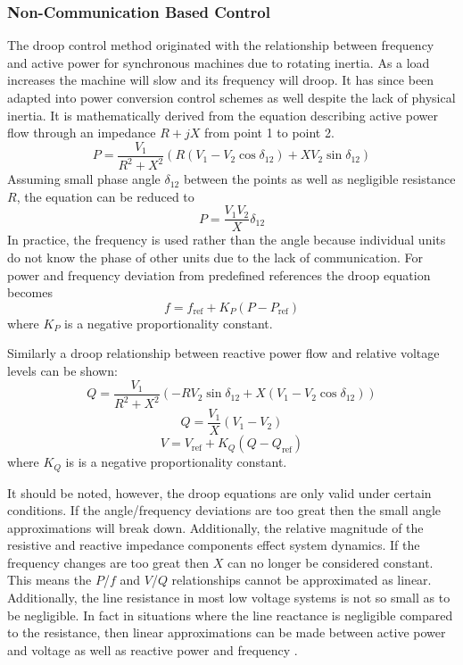 \subsubsection{Non-Communication Based Control}
The droop control method originated with the relationship between frequency and active power for synchronous machines due to rotating inertia. As a load increases the machine will slow and its frequency will droop. It has since been adapted into power conversion control schemes as well despite the lack of physical inertia. It is mathematically derived from the equation describing active power flow through an impedance $ R + jX $ from point 1 to point 2.
\begin{equation}
P = \frac{V_{1}}{R^2 + X^2} \left( R \left( V_{1}-V_{2}\cos{\delta_{12}} \right) +X V_{2} \sin{\delta_{12}} \right)
\end{equation}
Assuming small phase angle $\delta_{12}$ between the points as well as negligible resistance $R$, the equation can be reduced to 
\begin{equation}
P = \frac{V_1V_2}{X}\delta_{12}
\end{equation}
In practice, the frequency is used rather than the angle because individual units do not know the phase of other units due to the lack of communication. For power and frequency deviation from predefined references the droop equation becomes
\begin{equation}
f = f_{\text{ref}} + K_P\left(P - P_{\text{ref}}\right)
\end{equation}
where $K_P$ is a negative proportionality constant.

Similarly a droop relationship between reactive power flow and relative voltage levels can be shown:
\begin{equation}
Q = \frac{V_1}{R^2 + X^2} \left( -R V_2 \sin{\delta_{12}} + X \left(V_1 - V_2 \cos{\delta_{12}}\right) \right)
\end{equation}
\begin{equation}
Q = \frac{V_1}{X} \left( V_1 - V_2 \right)
\end{equation}
\begin{equation}
V = V_{\text{ref}} + K_Q \left( Q - Q_{\text{ref}} \right)
\end{equation}
where $K_Q$ is is a negative proportionality constant. 

It should be noted, however, the droop equations are only valid under certain conditions. If the angle/frequency deviations are too great then the small angle approximations will break down. Additionally, the relative magnitude of the resistive and reactive impedance components effect system dynamics. If the frequency changes are too great then $X$ can no longer be considered constant. This means the $P$/$f$ and $V$/$Q$ relationships cannot be approximated as linear. Additionally, the line resistance in most low voltage systems is not so small as to be negligible. In fact in situations where the line reactance is negligible compared to the resistance, then linear approximations can be made between active power and voltage as well as reactive power and frequency \cite{YunWeiLi2009}.



